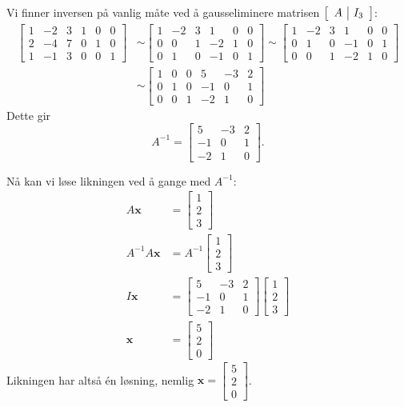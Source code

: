 \documentclass[notitlepage,a4paper,12pt,norsk]{IMFeksamen}
\newcommand{\roweq}{\sim}
\newcommand{\V}[1]{\mathbf{#1}}
\newcommand{\vvv}[3]{\begin{bmatrix} #1 \\ #2 \\ #3 \end{bmatrix}}
\newcommand{\x}{\V{x}}
\newcommand{\0}{\V{0}}
\newenvironment{amatrix}[1]{%
  \left[\begin{array}{*{#1}{c}|c}
}{%
  \end{array}\right]
}
\newcommand{\oppgslutt}{
\begin{center}
\pgfornament[width=6cm]{88}
\end{center}
}
\newenvironment{losning}{\begin{oppgave}}{\oppgslutt\end{oppgave}}
\begin{document}
\begin{losning}
Vi finner inversen på vanlig måte ved å gausseliminere matrisen
$\begin{amatrix}{1} A & I_3 \end{amatrix}$:
\begin{align*}
\left[
\begin{array}{ccc|ccc}
1 & -2 & 3 & 1 & 0 & 0\\
2 & -4 & 7 & 0 & 1 & 0\\
1 & -1 & 3 & 0 & 0 & 1
\end{array}
\right]
&\roweq
\left[
\begin{array}{ccc|ccc}
1 & -2 & 3 & 1  & 0 & 0\\
0 & 0  & 1 & -2 & 1 & 0\\
0 & 1  & 0 & -1 & 0 & 1
\end{array}
\right]
\roweq 
\left[
\begin{array}{ccc|ccc}
1 & -2 & 3 & 1  & 0 & 0\\
0 & 1  & 0 & -1 & 0 & 1\\
0 & 0  & 1 & -2 & 1 & 0
\end{array}
\right]\\
&\roweq
\left[
\begin{array}{ccc|ccc}
1 & 0 & 0 & 5  & -3 & 2\\
0 & 1 & 0 & -1 & 0  & 1\\
0 & 0 & 1 & -2 & 1  & 0
\end{array}
\right]
\end{align*}
Dette gir
\[
A^{-1}=
\begin{bmatrix}
5  & -3 & 2\\
-1 & 0  & 1\\
-2 & 1  & 0
\end{bmatrix}.
\]

Nå kan vi løse likningen ved å gange med $A^{-1}$:
\begin{align*}
A\x&=\vvv{1}{2}{3}\\
A^{-1}A\x&=A^{-1}\vvv{1}{2}{3}\\
I\x&=\begin{bmatrix}
5  & -3 & 2\\
-1 & 0  & 1\\
-2 & 1  & 0
\end{bmatrix}
\vvv{1}{2}{3}\\
\x&=\vvv{5}{2}{0}
\end{align*}
Likningen har altså én løsning, nemlig
$\x = \vvv{5}{2}{0}$.
\end{losning}
\end{document}

